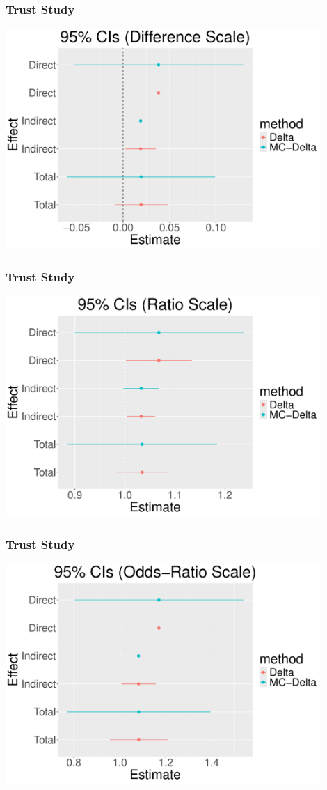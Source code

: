 \documentclass[14pt]{beamer}
\begin{document}
\begin{frame}
    \frametitle{Trust Study}
    \centering
    \includegraphics[height=0.9\textheight, width=0.9\textwidth, keepaspectratio]{Plots/CI_Plot-diff.pdf}
\end{frame}

\begin{frame}
    \frametitle{Trust Study}
    \centering
    \includegraphics[height=0.9\textheight, width=0.9\textwidth, keepaspectratio]{Plots/CI_Plot-rat.pdf}
\end{frame}

\begin{frame}
    \frametitle{Trust Study}
    \centering
    \includegraphics[height=0.9\textheight, width=0.9\textwidth, keepaspectratio]{Plots/CI_Plot-OR.pdf}
\end{frame}
\end{document}
